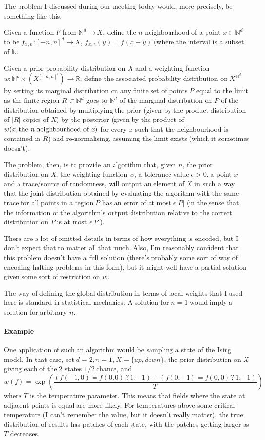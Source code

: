 \documentclass{article}
\begin{document}
The problem I discussed during our meeting today would, more precisely, be something like this. 

Given a function $F$ from $\mathbb N^d \to X$, define the $n$-neighbourhood of a point $x \in \mathbb N^d$ to be $f_{x, n} : [-n,n]^d \to X$, $f_{x,n}(y) = f(x+y)$ (where the interval is a subset of $\mathbb N$. 

Given a prior probability distribution on $X$ and a weighting function $w : \mathbb N^d \times (X^{[-n,n]^d}) \to \mathbb R$, define the associated probability distribution on $X^{\mathbb N^d}$ by setting its marginal distribution on any finite set of points $P$ equal to the limit as the finite region $R \subset \mathbb N^d$ goes to $\mathbb N^d$ of the marginal distribution on $P$ of the distribution obtained by multiplying the prior (given by the product distribution of $|R|$ copies of $X$) by the posterior (given by the product of $w(x, \hbox{the $n$-neighbourhood of $x$})$ for every $x$ such that the neighbourhood is contained in $R$) and re-normalising, assuming the limit exists (which it sometimes doesn't). 

The problem, then, is to provide an algorithm that, given $n$, the prior distribution on $X$, the weighting function $w$, a tolerance value $\epsilon > 0$, a point $x$ and a trace/source of randomness, will output an element of $X$ in such a way that the joint distribution obtained by evaluating the algorithm with the same trace for all points in a region $P$ has an error of at most $\epsilon |P|$ (in the sense that the information of the algorithm's output distribution relative to the correct distribution on $P$ is at most $\epsilon |P|$).

There are a lot of omitted details in terms of how everything is encoded, but I don't expect that to matter all that much. Also, I'm reasonably confident that this problem doesn't have a full solution (there's probably some sort of way of encoding halting problems in this form), but it might well have a partial solution given some sort of restriction on $w$. 

The way of defining the global distribution in terms of local weights that I used here is standard in statistical mechanics. A solution for $n=1$ would imply a solution for arbitrary $n$.

\paragraph{Example}

One application of such an algorithm would be sampling a state of the Ising model. In that case, set $d=2, n=1$, $X=\{\mathit{up}, \mathit{down}\}$, the prior distribution on $X$ giving each of the 2 states $1/2$ chance, and 
\[
w(f) = \exp\left(\frac{(f(-1,0) = f(0,0) \mathbin{?} 1 : -1) + (f(0,-1) = f(0,0) \mathbin{?} 1 : -1)}{T}\right)
\] 
where $T$ is the temperature parameter. 
This means that fields where the state at adjacent points is equal are more likely. 
For temperatures above some critical temperature (I can't remember the value, but it doesn't really matter), the true distribution of results has patches of each state, with the patches getting larger as $T$ decreases. 
\end{document}
